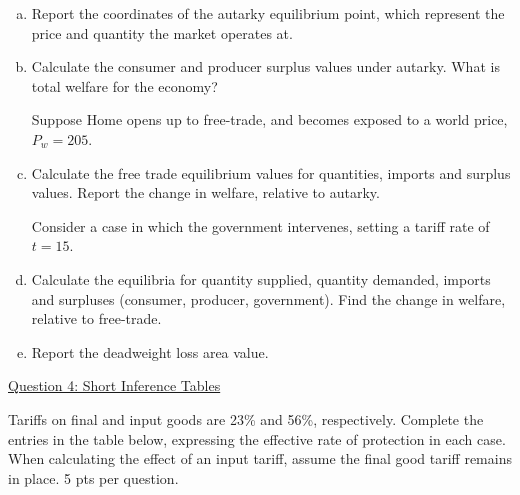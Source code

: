 \documentclass[12pt]{article}
\begin{document}
\begin{enumerate}[a)]
	\item Report the coordinates of the autarky equilibrium point, which represent the price and quantity the market operates at.
	
	\vspace{2in}
	
	\item Calculate the consumer and producer surplus values under autarky.  What is total welfare for the economy?
	
	\vspace{2.5in}
	
	\newpage
	
	\noindent Suppose Home opens up to free-trade, and becomes exposed to a world price, $P_w = 205$. 
	
	\item Calculate the free trade equilibrium values for quantities, imports and surplus values. 
	Report the change in welfare, relative to autarky. 
	
	\vspace{3in}
	
	\noindent Consider a case in which the government intervenes, setting a tariff rate of $t=15$. 
	
	\item Calculate the equilibria for quantity supplied, quantity demanded, imports and surpluses (consumer, producer, government). 
	Find the change in welfare, relative to free-trade. 
	
	\vspace{2in}
	
	\item Report the deadweight loss area value.
	
\end{enumerate}

\newpage

\noindent \underline{Question 4: Short Inference Tables}

\noindent Tariffs on final and input goods are 23\% and 56\%, respectively. Complete the entries in the table below, expressing the effective rate of protection in each case.
When calculating the effect of an input tariff, assume the final good tariff remains in place.
5 pts per question. 
\end{document}
